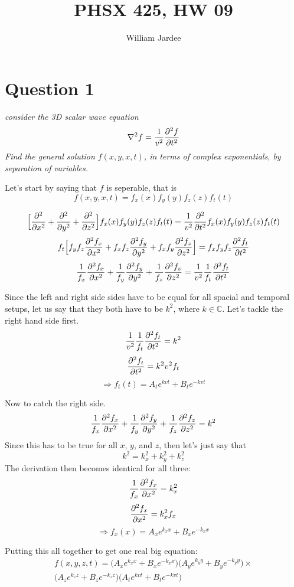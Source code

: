 \documentclass[12pt]{article}
\title{PHSX 425, HW 09}
\author{William Jardee}
\begin{document}
\maketitle

\section*{Question 1}
\emph{consider the 3D scalar wave equation}
\[\laplacian{f} = \frac{1}{v^2}\pdv[2]{f}{t}\]
\emph{Find the general solution $f(x,y,x,t)$, in terms of complex exponentials, by separation of variables.}\bigskip

Let's start by saying that $f$ is seperable, that is
\[f(x,y,x,t)=f_x(x)f_y(y)f_z(z)f_t(t)\]
\bigskip

\[\Big[\pdv[2]{x} + \pdv[2]{y} + \pdv[2]{z}\Big]f_x(x)f_y(y)f_z(z)f_t(t) = \frac{1}{v^2}\pdv[2]{t}f_x(x)f_y(y)f_z(z)f_t(t)\]
\[f_t\Big[f_y f_z\pdv[2]{f_x}{x} + f_x f_z\pdv[2]{f_y}{y} + f_x f_y\pdv[2]{f_z}{z}\Big] = f_xf_yf_z\pdv[2]{f_t}{t}\]
\[\frac{1}{f_x}\pdv[2]{f_x}{x} + \frac{1}{f_y}\pdv[2]{f_y}{y} + \frac{1}{f_z}\pdv[2]{f_z}{z} = \frac{1}{v^2}\frac{1}{f_t}\pdv[2]{f_t}{t}\]

Since the left and right side sides have to be equal for all spacial and temporal setups, let us say that they both have to be $k^2$, where $k \in \mathbb{C}$. Let's tackle the right hand side first.
\[\frac{1}{v^2}\frac{1}{f_t}\pdv[2]{f_t}{t} = k^2\]
\[\pdv[2]{f_t}{t} = k^2 v^2 f_t\]
\[\Rightarrow f_t(t) = A_t e^{kvt} + B_t e^{-kvt}\]

Now to catch the right side.
\[\frac{1}{f_x}\pdv[2]{f_x}{x} + \frac{1}{f_y}\pdv[2]{f_y}{y} + \frac{1}{f_z}\pdv[2]{f_z}{z} = k^2\]
Since this has to be true for all $x$, $y$, and $z$, then let's just say that 
\[k^2 = k_x^2 + k_y^2 + k_z^2\]
The derivation then becomes identical for all three:
\[\frac{1}{f_x}\pdv[2]{f_x}{x} = k_x^2\]
\[\pdv[2]{f_x}{x} = k_x^2 f_x\]
\[\Rightarrow f_x(x) = A_x e^{k_x x} + B_x e^{-k_x x}\]
\bigskip

Putting this all together to get one real big equation:
\begin{align*}
f(x,y,z,t) = \Big(A_x e^{k_x x} + B_x e^{-k_x x}\Big)\Big(A_y e^{k_y y} + B_y e^{-k_y y}\Big)\times\\
\Big(A_z e^{k_z z} + B_z e^{-k_z z}\Big)\Big(A_t e^{kvt} + B_t e^{-kvt}\Big)
\end{align*}

\newpage
\end{document}
